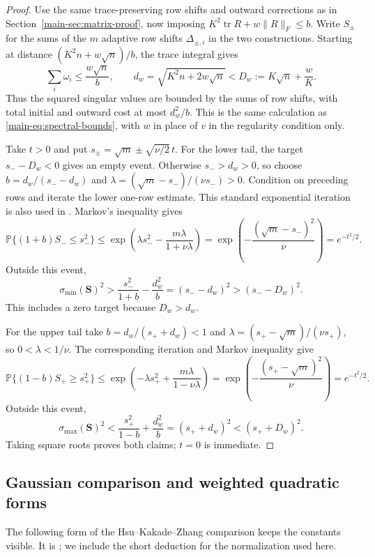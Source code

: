 \documentclass[11pt,a4paper]{article}
\newcommand{\paperref}[1]{\ref{main-#1}}
\newcommand{\papereqref}[1]{\eqref{main-#1}}
\newcommand{\paperref}[1]{\ref*{main-#1}}
\newcommand{\papereqref}[1]{\textup{(\ref*{main-#1})}}
\newcommand{\Ess}{\mathbf{S}}
\newcommand{\tr}{\operatorname{tr}}
\newcommand{\PP}{\mathbb P}
\numberwithin{equation}{section}
\begin{document}
\begin{proof}
Use the same trace-preserving row shifts and outward corrections as
in Section~\paperref{sec:matrix-proof}, now imposing
$K^2\tr R+w\|R\|_F\le b$. Write $S_\pm$ for the sums of the $m$
adaptive row shifts $\Delta_{\pm,i}$ in the two constructions.
Starting at distance
$(K^2n+w\sqrt n)/b$, the trace integral gives
\[
 \sum_i\omega_i\le\frac{w\sqrt n}{b},\qquad
 d_w=\sqrt{K^2n+2w\sqrt n}
 <D_w:=K\sqrt n+\frac wK.
\]
Thus the squared singular values are bounded by the sums of row shifts,
with total initial and outward cost at most $d_w^2/b$.
This is the same calculation as \papereqref{eq:spectral-bounds}, with $w$
in place of $v$ in the regularity condition only.

Take $t>0$ and put $s_\pm=\sqrt m\pm\sqrt{\nu/2}\,t$.
For the lower tail, the target $s_--D_w<0$ gives an empty event.
Otherwise $s_->d_w>0$, so choose
$b=d_w/(s_--d_w)$ and
$\lambda=(\sqrt m-s_-)/(\nu s_-)>0$.
Condition on preceding rows and iterate the lower one-row estimate.
This standard exponential iteration is also used in
\cite[Theorem~2.6]{fan2015exponential}.
Markov's inequality gives
\[
 \PP\{(1+b)S_-\le s_-^2\}
 \le\exp\!\left(\lambda s_-^2-\frac{m\lambda}{1+\nu\lambda}\right)
 =\exp\!\left(-\frac{(\sqrt m-s_-)^2}{\nu}\right)
 =e^{-t^2/2}.
\]
Outside this event,
\[
 \sigma_{\min}(\Ess)^2>\frac{s_-^2}{1+b}-\frac{d_w^2}{b}
 =(s_--d_w)^2>(s_--D_w)^2.
\]
This includes a zero target because $D_w>d_w$.

For the upper tail take $b=d_w/(s_++d_w)<1$ and
$\lambda=(s_+-\sqrt m)/(\nu s_+)$, so $0<\lambda<1/\nu$.
The corresponding iteration and Markov inequality give
\[
 \PP\{(1-b)S_+\ge s_+^2\}
 \le\exp\!\left(-\lambda s_+^2+\frac{m\lambda}{1-\nu\lambda}\right)
 =\exp\!\left(-\frac{(s_+-\sqrt m)^2}{\nu}\right)
 =e^{-t^2/2}.
\]
Outside this event,
\[
 \sigma_{\max}(\Ess)^2<\frac{s_+^2}{1-b}+\frac{d_w^2}{b}
 =(s_++d_w)^2<(s_++D_w)^2.
\]
Taking square roots proves both claims; $t=0$ is immediate.
\end{proof}

\subsection{Gaussian comparison and weighted quadratic forms}
\label{app:weighted}

The following form of the Hsu--Kakade--Zhang comparison keeps the
constants visible. It is \cite[Remark~2.3]{hsu2012tail}; we include
the short deduction for the normalization used here.
\end{document}
